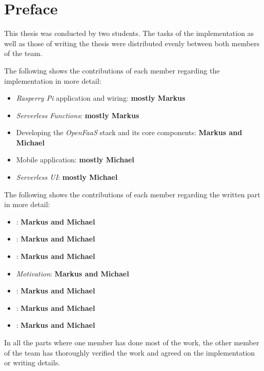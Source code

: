 \chapter*{Preface}

This thesis was conducted by two students. The tasks of the implementation as well as those of
writing the thesis were distributed evenly between both members of the team.

The following shows the contributions of each member regarding the implementation in more detail:

\begin{itemize}
  \setlength\itemsep{-1em}
  \item \textit{Rasperry Pi} application and wiring: \textbf{mostly Markus}
  \item \textit{Serverless Functions}: \textbf{mostly Markus}
  \item Developing the \textit{OpenFaaS} stack and its core components: \textbf{Markus and Michael}
  \item Mobile application: \textbf{mostly Michael}
  \item \textit{Serverless UI}: \textbf{mostly Michael}
\end{itemize}

The following shows the contributions of each member regarding the written part in more detail:

\begin{itemize}
  \setlength\itemsep{-1em}
  \item {} : \textbf{Markus and Michael}
  \item {} : \textbf{Markus and Michael}
  \item {} : \textbf{Markus and Michael}
  \item {}  \textit{Motivation}: \textbf{Markus and Michael}
  \item {} : \textbf{Markus and Michael}
  \item {} : \textbf{Markus and Michael}
  \item {} : \textbf{Markus and Michael}
\end{itemize}

In all the parts where one member has done most of the work, the other member of the team has
thoroughly verified the work and agreed on the implementation or writing details.
